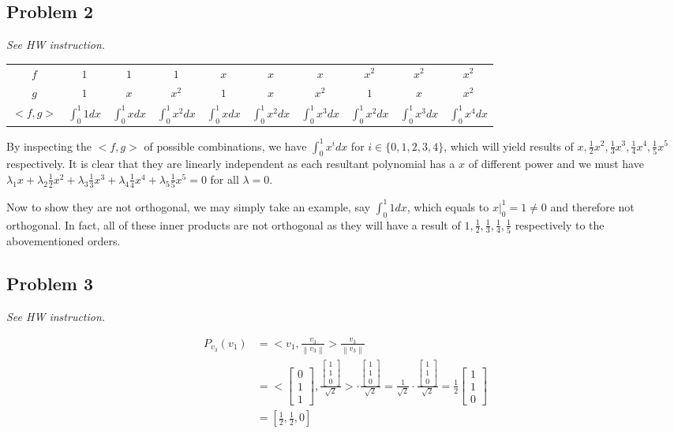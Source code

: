 \documentclass[11pt]{article}
\providecommand{\qbm}[1]{\begin{bmatrix} #1 \end{bmatrix}}
\providecommand{\norm}[1]{\left\lVert #1 \right\rVert}
\begin{document}
\subsection*{Problem 2}
\textit{See HW instruction.}\newline


\begin{table}
    \centering
    \begin{tabular}{ c | c c c c c c c c c}
        \hline
        $f$ & $1$ & $1$ & $1$ & $x$ & $x$ & $x$ & $x^2$ & $x^2$ & $x^2$ \\
        $g$ & $1$ & $x$ & $x^2$ & $1$ & $x$ & $x^2$ & $1$ & $x$ & $x^2$ \\
        \hline
        $<f, g>$ & $\int_{0}^{1} 1 dx$ & $\int_{0}^{1} x dx$ & $\int_{0}^{1} x^2 dx$ & $\int_{0}^{1} x dx$ & $\int_{0}^{1} x^2 dx$ & $\int_{0}^{1} x^3 dx$ & $\int_{0}^{1} x^2 dx$  & $\int_{0}^{1} x^3 dx$ & $\int_{0}^{1} x^4 dx$
    \end{tabular}
\end{table}

By inspecting the $<f, g>$ of possible combinations, we have $\int_{0}^{1} x^i dx$ for $i \in \{0, 1, 2, 3, 4\}$, which will yield results of $x, \frac{1}{2}x^2, \frac{1}{3}x^3, \frac{1}{4}x^4, \frac{1}{5}x^5$ respectively. It is clear that they are linearly independent as each resultant polynomial has a $x$ of different power and we must have $\lambda_{1}x + \lambda_{2}\frac{1}{2}x^2 + \lambda_{3}\frac{1}{3}x^3 + \lambda_{4}\frac{1}{4}x^4 + \lambda_{5}\frac{1}{5}x^5 = 0$ for all $\lambda = 0$.

Now to show they are not orthogonal, we may simply take an example, say $\int_{0}^{1} 1 dx$, which equals to $x \Big|^1_0 = 1 \neq 0$ and therefore not orthogonal. In fact, all of these inner products are not orthogonal as they will have a result of $1, \frac{1}{2}, \frac{1}{3}, \frac{1}{4}, \frac{1}{5}$ respectively to the abovementioned orders.

\subsection*{Problem 3}
\textit{See HW instruction.}\newline


\begin{align*}
    P_{v_3}(v_1) &= < v_1, \frac{v_3}{\norm{v_3}} > \frac{v_3}{\norm{v_3}} \\
    &= < \qbm{0 \\ 1 \\ 1}, \frac{\qbm{1 \\ 1 \\ 0}}{\sqrt{2}} > \cdot \frac{\qbm{1 \\ 1 \\ 0}}{\sqrt{2}} = \frac{1}{\sqrt{2}} \cdot \frac{\qbm{1 \\ 1 \\ 0}}{\sqrt{2}} = \frac{1}{2} \qbm{1 \\ 1 \\ 0} \\
    &= [\frac{1}{2}, \frac{1}{2}, 0]
\end{align*}
\end{document}
